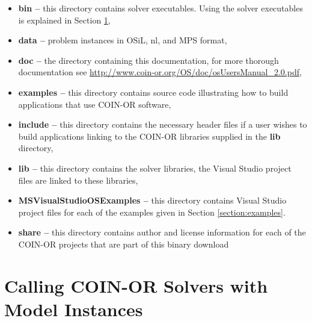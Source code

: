 \documentclass[11pt]{article}
\renewcommand{\_}{{\char"5F}}
\renewcommand{\{}{{\char"7B}}
\renewcommand{\}}{{\char"7D}}
\renewcommand{\^}{{\char"0D}}
\renewcommand{\'}{{\char"0D}}
\begin{document}
\begin{itemize}
\item {\bf bin --} this directory contains  solver executables. Using the solver executables is explained in Section \ref{section:callingsolvers},

\item {\bf data --} problem instances in OSiL, nl, and MPS format,

\item {\bf doc --} the directory containing this documentation, for more thorough documentation
see \url{http://www.coin-or.org/OS/doc/osUsersManual_2.0.pdf},


\item {\bf examples --} this directory contains source code illustrating how to build applications that use COIN-OR software, 

\item {\bf include -- } this directory contains the necessary header files if a user wishes to build applications linking to the COIN-OR libraries supplied in the {\bf lib} directory,

\item {\bf lib --} this directory contains the solver libraries, the Visual Studio project files are linked to these libraries,


\item {\bf MSVisualStudioOSExamples -- } this directory contains Visual Studio  project files for each of the examples given  in Section \ref{section:examples}.


\item {\bf share --}  this directory contains author and license information for each of the  COIN-OR projects that are part of this binary download
\end{itemize}

\section{Calling COIN-OR Solvers with Model Instances}\label{section:callingsolvers}
\end{document}

